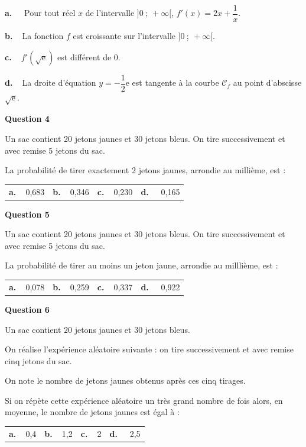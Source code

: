 \documentclass[10pt]{article}
\begin{document}
\textbf{a.~~} Pour tout réel $x$ de l'intervalle $]0~;~+ \infty[$, \: $f'(x) = 2x + \dfrac1x$.

\textbf{b.~~}La fonction $f$ est croissante sur l'intervalle $]0~;~+ \infty[$.

\textbf{c.~~}$f'\left(\sqrt{\text{e}} \right)$ est différent de $0$.

\textbf{d.~~}La droite d'équation $y = - \dfrac12 \text{e}$ est tangente à la courbe $\mathcal{C}_f$ au point d'abscisse $\sqrt{\text{e}}$.

\medskip

\textbf{Question 4}

\medskip

Un sac contient 20 jetons jaunes et 30 jetons bleus. On tire successivement et avec remise 5 jetons du sac.

La probabilité de tirer exactement 2 jetons jaunes, arrondie au millième, est :

\begin{center}
\begin{tabularx}{\linewidth}{*{4}{X}}
\textbf{a.~~}0,683&\textbf{b.~~}0,346 &\textbf{c.~~}0,230&\textbf{d.~~} 0,165
\end{tabularx}
\end{center}

\medskip

\textbf{Question 5}

\medskip

Un sac contient 20 jetons jaunes et 30 jetons bleus. On tire successivement et avec remise 5 jetons du sac.

La probabilité de tirer au moins un jeton jaune, arrondie au milllième, est :

\begin{center}
\begin{tabularx}{\linewidth}{*{4}{X}}
\textbf{a.~~}0,078&\textbf{b.~~}0,259 &\textbf{c.~~}0,337&\textbf{d.~~} 0,922
\end{tabularx}
\end{center}

\medskip

\textbf{Question 6}

\medskip

Un sac contient $20$ jetons jaunes et $30$ jetons bleus.

On réalise l'expérience aléatoire suivante : on tire successivement et avec remise cinq jetons du sac. 

On note le nombre de jetons jaunes obtenus après ces cinq tirages. 

Si on répète cette expérience aléatoire un très grand nombre de fois alors, en moyenne, le nombre de jetons jaunes est égal à :

\begin{center}
\begin{tabularx}{\linewidth}{*{4}{X}}
\textbf{a.~~}0,4&\textbf{b.~~}1,2 &\textbf{c.~~}2&\textbf{d.~~} 2,5
\end{tabularx}
\end{center}
\end{document}
